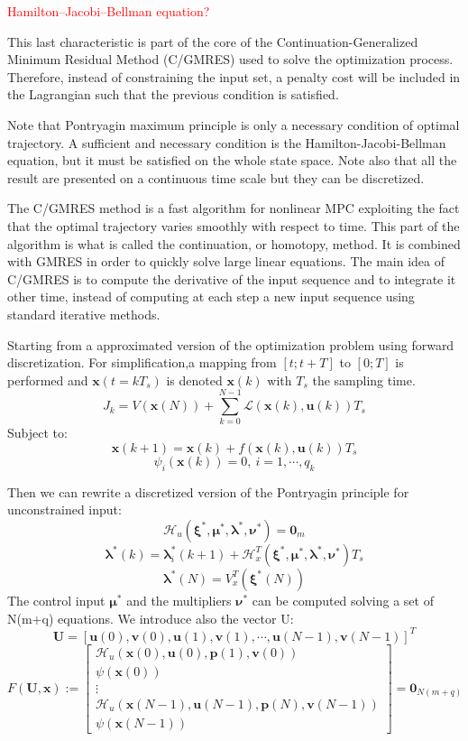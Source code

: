 \documentclass[a4paper, 12pt]{report}
\begin{document}
 \textcolor{red}{Hamilton–Jacobi–Bellman equation?}

This last characteristic is part of the core of the Continuation-Generalized Minimum Residual Method (C/GMRES)\cite{Ohtsuka2004} used to solve the optimization process. Therefore, instead of constraining the input set, a penalty cost will be included in the Lagrangian such that the previous condition is satisfied.

Note that Pontryagin maximum principle is only a necessary condition of optimal trajectory. A sufficient and necessary condition is the Hamilton-Jacobi-Bellman equation, but it must be satisfied on the whole state space. Note also that all the result are presented on a continuous time scale but they can be discretized.

The C/GMRES method is a fast algorithm for nonlinear MPC exploiting the fact that the optimal trajectory varies smoothly with respect to time. This part of the algorithm is what is called the continuation, or homotopy, method. It is combined with GMRES in order to quickly solve large linear equations. The main idea of C/GMRES is to compute the derivative of the input sequence and to integrate it other time, instead of computing at each step a new input sequence using standard iterative methods.

Starting from a approximated version of the optimization problem using forward discretization. For simplification,a mapping from $[t; t+T]$ to $[0; T]$ is performed and $\boldsymbol{x}(t = kT_s)$ is denoted $\boldsymbol{x}(k)$ with $T_s$ the sampling time.
\[ J_k = V(\boldsymbol{x}(N)) + \sum_{k = 0}^{N-1} \mathcal{L}(\boldsymbol{x}(k), \boldsymbol{u}(k))T_s \]
Subject to:
\[ \boldsymbol{x}(k+1) = \boldsymbol{x}(k) + f(\boldsymbol{x}(k),\boldsymbol{u}(k))T_s \]
\[ \psi_i(\boldsymbol{x}(k)) = 0,\ i = 1, \cdots, q_k \]

Then we can rewrite a discretized version of the Pontryagin principle for unconstrained input:
\[ \mathcal{H}_u(\boldsymbol{\xi}^*, \boldsymbol{\mu}^*, \boldsymbol{\lambda}^*, \boldsymbol{\nu}^*) = \boldsymbol{0}_m \]
\[ \boldsymbol{\lambda}^*(k)  = \boldsymbol{\lambda}_i^*(k+1) + \mathcal{H}_x^T(\boldsymbol{\xi}^*, \boldsymbol{\mu}^*, \boldsymbol{\lambda}^*, \boldsymbol{\nu}^*) T_s\]
\[ \boldsymbol{\lambda}^*(N) = V_x^T(\boldsymbol{\xi}^*(N)) \]
The control input $\boldsymbol{\mu}^*$ and the multipliers $\boldsymbol{\nu}^*$ can be computed solving a set of N(m+q) equations. We introduce also the vector U:
\[\boldsymbol{U} = [\boldsymbol{u}(0), \boldsymbol{v}(0), \boldsymbol{u}(1), \boldsymbol{v}(1), \cdots, \boldsymbol{u}(N-1), \boldsymbol{v}(N-1)]^T \]
\[F(\boldsymbol{U},\boldsymbol{x}) := \begin{bmatrix} \mathcal{H}_u(\boldsymbol{x}(0), \boldsymbol{u}(0), \boldsymbol{p}(1), \boldsymbol{v}(0)) \\ \psi(\boldsymbol{x}(0)) \\ \vdots \\ \mathcal{H}_u (\boldsymbol{x}(N-1), \boldsymbol{u}(N-1), \boldsymbol{p}(N), \boldsymbol{v}(N-1)) \\ \psi(\boldsymbol{x}(N-1))\end{bmatrix} = \boldsymbol{0}_{N(m+q)}\]
\end{document}
